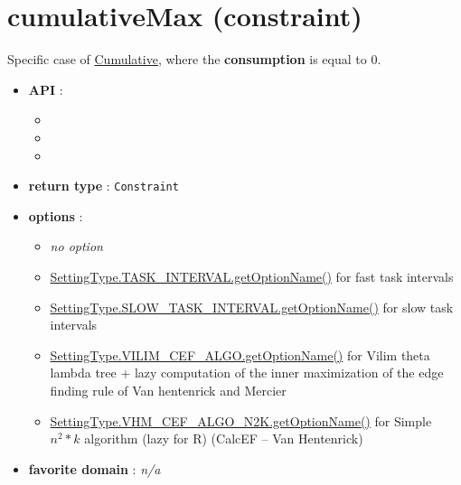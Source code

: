 \section{cumulativeMax (constraint)}\label{cumulativemax:cumulativemaxconstraint}\hypertarget{cumulativemax:cumulativemaxconstraint}{}
Specific case of \hyperlink{cumulative:cumulativeconstraint}{Cumulative}, where the \textbf{consumption} is equal to 0.

\begin{itemize}
	\item \textbf{API} :
	\begin{itemize}
		\item {}
		\item {}
		\item {}
	\end{itemize}
	\item \textbf{return type} : \texttt{Constraint}
	\item \textbf{options} :
	\begin{itemize}
		\item \emph{no option}
		\item \hyperlink{ccumulativeti:ccumulativetioptions}{SettingType.TASK\_INTERVAL.getOptionName()} for fast task intervals
		\item \hyperlink{ccumulativesti:ccumulativestioptions}{SettingType.SLOW\_TASK\_INTERVAL.getOptionName()} for slow task intervals
		\item \hyperlink{ccumulativecef:ccumulativecefoptions}{SettingType.VILIM\_CEF\_ALGO.getOptionName()} for Vilim theta lambda tree + lazy computation of the inner maximization of the edge finding rule of Van hentenrick and Mercier
		\item \hyperlink{ccumulativescef:ccumulativescefoptions}{SettingType.VHM\_CEF\_ALGO\_N2K.getOptionName()} for Simple $n^2 * k$ algorithm (lazy for R) (CalcEF -- Van Hentenrick)
	\end{itemize}
	\item \textbf{favorite domain} : \emph{n/a}
\end{itemize}